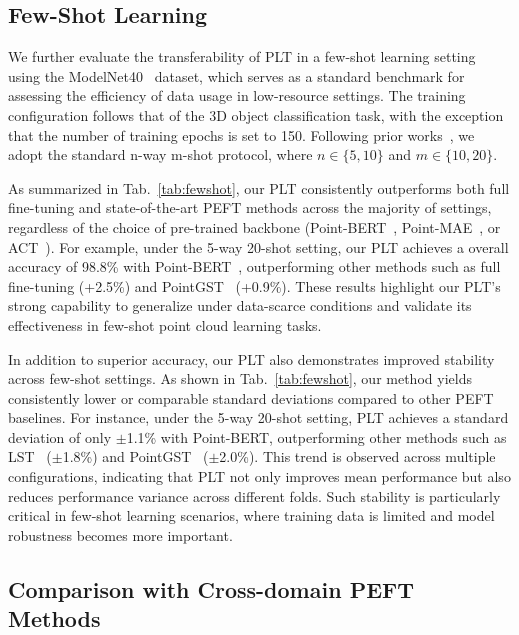 

\subsection{Few-Shot Learning}
\label{sec:few_shot}

We further evaluate the transferability of PLT in a few-shot learning setting using the ModelNet40~\cite{wu20153d} dataset, which serves as a standard benchmark for assessing the efficiency of data usage in low-resource settings. The training configuration follows that of the 3D object classification task, with the exception that the number of training epochs is set to 150. Following prior works~\cite{zha2023instance, zhou2024dynamic}, we adopt the standard n-way m-shot protocol, where $n \in \{5, 10\}$ and $m \in \{10, 20\}$.

As summarized in Tab.~\ref{tab:fewshot}, our PLT consistently outperforms both full fine-tuning and state-of-the-art PEFT methods across the majority of settings, regardless of the choice of pre-trained backbone (Point-BERT~\cite{yu2022point}, Point-MAE~\cite{pang2022masked}, or ACT~\cite{dong2022autoencoders}). For example, under the 5-way 20-shot setting, our PLT achieves a overall accuracy of 98.8\% with Point-BERT~\cite{yu2022point}, outperforming other methods such as full fine-tuning (+2.5\%) and PointGST~\cite{liang2024parameter} (+0.9\%). These results highlight our PLT's strong capability to generalize under data-scarce conditions and validate its effectiveness in few-shot point cloud learning tasks. 

In addition to superior accuracy, our PLT also demonstrates improved stability across few-shot settings. As shown in Tab.~\ref{tab:fewshot}, our method yields consistently lower or comparable standard deviations compared to other PEFT baselines. For instance, under the 5-way 20-shot setting, PLT achieves a standard deviation of only $\pm$1.1\% with Point-BERT, outperforming other methods such as LST~\cite{sung2022lst} ($\pm$1.8\%) and PointGST~\cite{liang2024parameter} ($\pm$2.0\%). This trend is observed across multiple configurations, indicating that PLT not only improves mean performance but also reduces performance variance across different folds. Such stability is particularly critical in few-shot learning scenarios, where training data is limited and model robustness becomes more important.

\subsection{Comparison with Cross-domain PEFT Methods}
\label{sec:compare}

